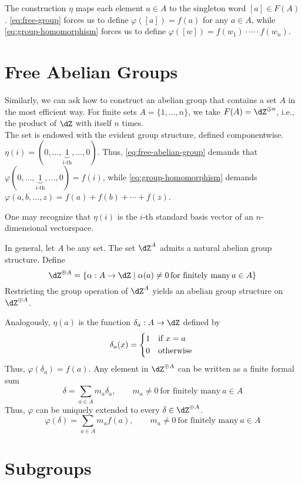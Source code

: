 \documentclass{amsart}
\begin{document}
The construction $\eta$ maps each element $a \in A$ to the singleton word $[a] \in F(A)$.
\eqref{eq:free-group} forces us to define $\varphi([a]) = f(a)$ for any $a \in A$, while \eqref{eq:group-homomorphism} forces us to define $\varphi([w]) = f(w_{1}) \cdot \cdots \cdot f(w_{n})$.

\section{Free Abelian Groups}
\label{sec:free-abelian-groups}

Similarly, we can ask how to construct an abelian group that contains a set $A$ in the most efficient way.
For finite sets $A = \{1,\ldots,n\}$, we take $F(A) = \dZ^{\oplus n}$, i.e., the product of $\dZ$ with itself $n$ times.
\begin{equation}
  \label{eq:free-abelian-group}
  
\end{equation}
The set is endowed with the evident group structure, defined componentwise.
$\eta(i) = (0,\ldots,\underbrace{1}_{i\text{-th}},\ldots,0)$.
Thus, \eqref{eq:free-abelian-group} demands that $\varphi(0,\ldots,\underbrace{1}_{i\text{-th}},\ldots,0) = f(i)$, while \eqref{eq:group-homomorphism} demands $\varphi(a,b,\ldots,z) = f(a) + f(b) + \cdots + f(z)$.

One may recognize that $\eta(i)$ is the $i$-th standard basis vector of an $n$-dimensional vectorspace.

In general, let $A$ be any set.
The set $\dZ^{A}$ admits a natural abelian group structure.
Define
\[
  \dZ^{\oplus A} = \{\alpha : A \to \dZ \mid \alpha(a) \neq 0 \,\text{for finitely many}\, a \in A\}
\]
Restricting the group operation of $\dZ^{A}$ yields an abelian group structure on $\dZ^{\oplus A}$.

Analogously, $\eta(a)$ is the function $\delta_{a} : A \to \dZ$ defined by
\[
  \delta_{a}(x) =
  \begin{dcases*}
    1 & if $x = a$\\
    0 & otherwise
  \end{dcases*}
\]
Thus, $\varphi(\delta_{a}) = f(a)$.
Any element in $\dZ^{\oplus A}$ can be written as a finite formal sum
\[
  \delta = \sum_{a \in A}m_{a}\delta_{a}, \qquad m_{a} \neq 0~\text{for finitely many}~a \in A
\]
Thus, $\varphi$ can be uniquely extended to every $\delta \in \dZ^{\oplus A}$.
\[
  \varphi(\delta) = \sum_{a \in A}m_{a}f(a), \qquad m_{a} \neq 0~\text{for finitely many}~a \in A
\]

\section{Subgroups}
\label{sec:subgroups}
\end{document}

